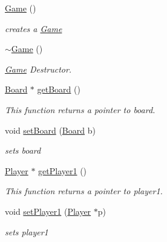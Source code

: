 \begin{DoxyCompactItemize}
\item 
\hyperlink{classGame_ad59df6562a58a614fda24622d3715b65}{Game} ()
\begin{DoxyCompactList}\small\item\em creates a \hyperlink{classGame}{Game} \item\end{DoxyCompactList}\item 
\hypertarget{classGame_ae3d112ca6e0e55150d2fdbc704474530}{
\hyperlink{classGame_ae3d112ca6e0e55150d2fdbc704474530}{$\sim$Game} ()}
\label{classGame_ae3d112ca6e0e55150d2fdbc704474530}

\begin{DoxyCompactList}\small\item\em \hyperlink{classGame}{Game} Destructor. \item\end{DoxyCompactList}\item 
\hyperlink{classBoard}{Board} $\ast$ \hyperlink{classGame_aac82d38c4540fcfaef89059865d1ce31}{getBoard} ()
\begin{DoxyCompactList}\small\item\em This function returns a pointer to board. \item\end{DoxyCompactList}\item 
void \hyperlink{classGame_af7023c9a15575e9ecd0ce68b7dfa0900}{setBoard} (\hyperlink{classBoard}{Board} b)
\begin{DoxyCompactList}\small\item\em sets board \item\end{DoxyCompactList}\item 
\hyperlink{classPlayer}{Player} $\ast$ \hyperlink{classGame_a01d7146d789990ee8195bdcca57c327e}{getPlayer1} ()
\begin{DoxyCompactList}\small\item\em This function returns a pointer to player1. \item\end{DoxyCompactList}\item 
void \hyperlink{classGame_a7d45a62dd687fcc5da92399ce4ce38e4}{setPlayer1} (\hyperlink{classPlayer}{Player} $\ast$p)
\begin{DoxyCompactList}\small\item\em sets player1 \item\end{DoxyCompactList}\item 

\end{DoxyCompactItemize}
